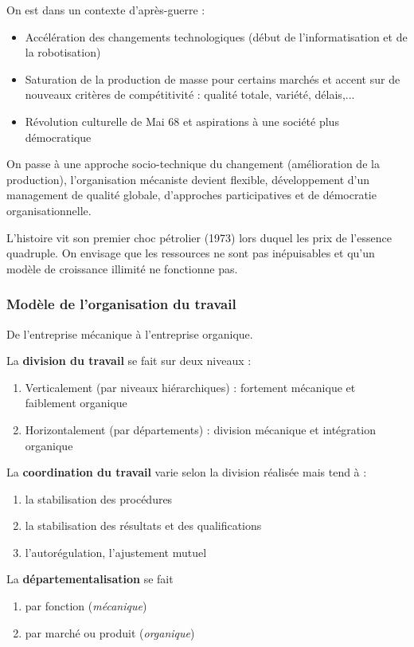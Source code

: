 \documentclass[12pt]{article}
\begin{document}
	On est dans un contexte d'après-guerre :
	
	\begin{itemize}
	 \item Accélération des changements technologiques (début de l'informatisation et de la robotisation)
	 \item Saturation de la production de masse pour certains marchés et accent sur de nouveaux critères de compétitivité : qualité totale, variété, délais,...
	 \item Révolution culturelle de Mai 68 et aspirations à une société plus démocratique
	\end{itemize}
	
	On passe à une approche socio-technique du changement (amélioration de la production), l'organisation mécaniste devient flexible, développement d'un management de qualité globale, d'approches participatives et de démocratie organisationnelle.
	
	L'histoire vit son premier choc pétrolier (1973) lors duquel les prix de l'essence quadruple. On envisage que les ressources ne sont pas inépuisables et qu'un modèle de croissance illimité ne fonctionne pas.
	
	\subsubsection{Modèle de l'organisation du travail}
	De l'entreprise mécanique à l'entreprise organique.
	
	La \textbf{division du travail} se fait sur deux niveaux :
	\begin{enumerate}
	 \item Verticalement (par niveaux hiérarchiques) : fortement mécanique et faiblement organique
	 \item Horizontalement (par départements) : division mécanique et intégration organique
	\end{enumerate}
	
	La \textbf{coordination du travail} varie selon la division réalisée mais tend à :
	\begin{enumerate}
	 \item la stabilisation des procédures
	 \item la stabilisation des résultats et des qualifications
	 \item l'autorégulation, l'ajustement mutuel
	\end{enumerate}
	
	La \textbf{départementalisation} se fait
	\begin{enumerate}
	 \item par fonction (\emph{mécanique})
	 \item par marché ou produit (\emph{organique})
	\end{enumerate}
	
\end{document}
